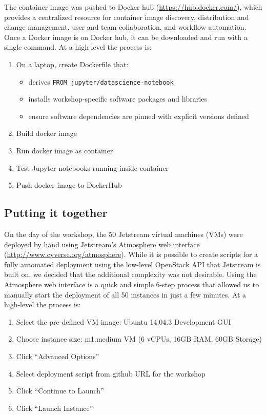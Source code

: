 The container image was pushed to Docker hub (\url{https://hub.docker.com/}),
which provides a centralized resource for container image discovery,
distribution and change management, user and team collaboration, and workflow
automation. Once a Docker image is on Docker hub, it can be downloaded and run
with a single command. At a high-level the process is:

\begin{enumerate}
  \item On a laptop, create Dockerfile that:
  \begin{itemize}
    \item derives \texttt{FROM jupyter/datascience-notebook}
    \item installs workshop-specific software packages and libraries
    \item ensure software dependencies are pinned with explicit versions defined
  \end{itemize}
  \item Build docker image
  \item Run docker image as container
  \item Test Jupyter notebooks running inside container
  \item Push docker image to DockerHub
\end{enumerate}


\subsection{Putting it together}

On the day of the workshop, the 50 Jetstream virtual machines (VMs) were
deployed by hand using Jetstream's Atmosphere\cite{NiravCyberinfra2016} web interface
(\url{http://www.cyverse.org/atmosphere}). While it is possible to create
scripts for a fully automated deployment using the low-level OpenStack API that
Jetstream is built on, we decided that the additional complexity was not
desirable. Using the Atmosphere web interface is a quick and simple 6-step
process that allowed us to manually start the deployment of all 50 instances in
just a few minutes. At a high-level the process is:

\begin{enumerate}
\item Select the pre-defined VM image: Ubuntu 14.04.3 Development GUI
\item Choose instance size: m1.medium VM (6 vCPUs, 16GB RAM, 60GB
  Storage)
\item Click ``Advanced Options''
\item Select deployment script from github URL for the workshop
\item Click ``Continue to Launch''
\item Click ``Launch Instance''
\end{enumerate}

